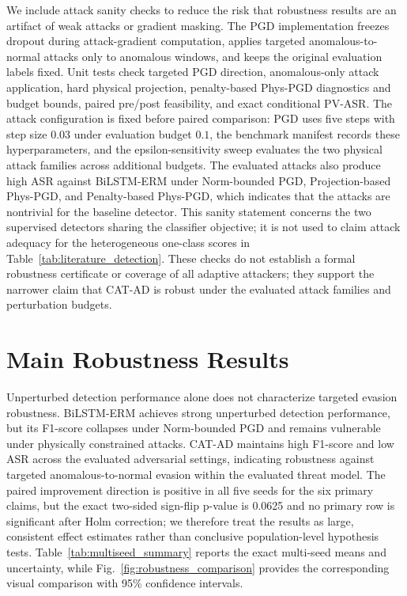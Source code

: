 \documentclass[runningheads]{llncs}
\begin{document}
We include attack sanity checks to reduce the risk that robustness results are an artifact of weak attacks or gradient masking.
The PGD implementation freezes dropout during attack-gradient computation, applies targeted anomalous-to-normal attacks only to anomalous windows, and keeps the original evaluation labels fixed.
Unit tests check targeted PGD direction, anomalous-only attack application, hard physical projection, penalty-based Phys-PGD diagnostics and budget bounds, paired pre/post feasibility, and exact conditional PV-ASR.
The attack configuration is fixed before paired comparison: PGD uses five steps with step size $0.03$ under evaluation budget $0.1$, the benchmark manifest records these hyperparameters, and the epsilon-sensitivity sweep evaluates the two physical attack families across additional budgets.
The evaluated attacks also produce high ASR against BiLSTM-ERM under Norm-bounded PGD, Projection-based Phys-PGD, and Penalty-based Phys-PGD, which indicates that the attacks are nontrivial for the baseline detector.
This sanity statement concerns the two supervised detectors sharing the classifier objective; it is not used to claim attack adequacy for the heterogeneous one-class scores in Table~\ref{tab:literature_detection}.
These checks do not establish a formal robustness certificate or coverage of all adaptive attackers; they support the narrower claim that CAT-AD is robust under the evaluated attack families and perturbation budgets.





\section{Main Robustness Results}
\label{sec:main_results}

Unperturbed detection performance alone does not characterize targeted evasion robustness.
BiLSTM-ERM achieves strong unperturbed detection performance, but its F1-score collapses under Norm-bounded PGD and remains vulnerable under physically constrained attacks.
CAT-AD maintains high F1-score and low ASR across the evaluated adversarial settings, indicating robustness against targeted anomalous-to-normal evasion within the evaluated threat model.
The paired improvement direction is positive in all five seeds for the six primary claims, but the exact two-sided sign-flip p-value is 0.0625 and no primary row is significant after Holm correction; we therefore treat the results as large, consistent effect estimates rather than conclusive population-level hypothesis tests.
Table~\ref{tab:multiseed_summary} reports the exact multi-seed means and uncertainty, while Fig.~\ref{fig:robustness_comparison} provides the corresponding visual comparison with 95\% confidence intervals.
\end{document}
